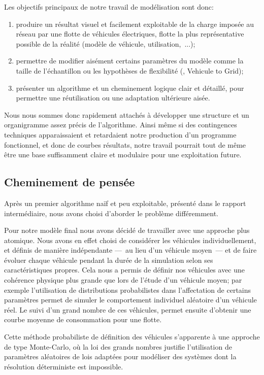 			Les objectifs principaux de notre travail de modélisation sont donc:
			\begin{enumerate}
				\item produire un résultat visuel et facilement exploitable de la charge imposée au réseau par une flotte de véhicules électriques, flotte la plus représentative possible de la réalité (modèle de véhicule, utilisation,~...);
				\item permettre de modifier aisément certains paramètres du modèle comme la taille de l'échantillon ou les hypothèses de flexibilité (\smartgrid{}, Vehicule to Grid);
				\item présenter un algorithme et un cheminement logique clair et détaillé, pour permettre une réutilisation ou une adaptation ultérieure aisée.
			\end{enumerate}
			Nous nous sommes donc rapidement attachés à développer une structure et un organigramme assez précis de l'algorithme. Ainsi même si des contingences techniques apparaissaient et retardaient notre production d'un programme fonctionnel, et donc de courbes résultats, notre travail pourrait tout de même être une base suffisamment claire et modulaire pour une exploitation future.

	\subsection{Cheminement de pensée}
		Après un premier algorithme naïf et peu exploitable, présenté dans le rapport intermédiaire, nous avons choisi d'aborder le problème différemment.
		
		Pour notre modèle final nous avons décidé de travailler avec une approche plus atomique. Nous avons en effet choisi de considérer les véhicules individuellement, et définis de manière indépendante ---~au lieu d'un véhicule moyen~---  et de faire évoluer chaque véhicule pendant la durée de la simulation selon ses caractéristiques propres.
		Cela nous a permis de définir nos véhicules avec une cohérence physique plus grande que lors de l'étude d'un véhicule moyen; par exemple l'utilisation de distributions probabilistes dans l'affectation de certains paramètres permet de simuler le comportement individuel aléatoire d'un véhicule réel.
		Le suivi d'un grand nombre de ces véhicules, permet ensuite d'obtenir une courbe moyenne de consommation pour une flotte.
		
		Cette méthode probabiliste de définition des véhicules s'apparente à une approche de type Monte-Carlo, où la loi des grands nombres justifie l'utilisation de paramètres aléatoires de lois adaptées pour modéliser des systèmes dont la résolution déterministe est impossible.
		
